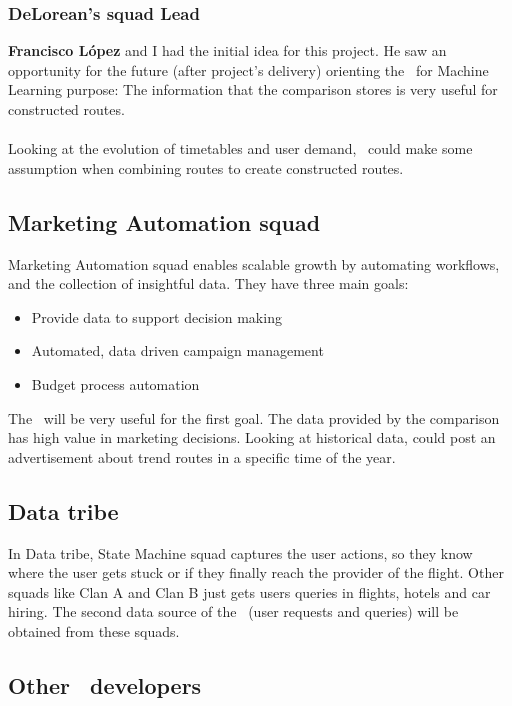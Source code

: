 \subsubsection*{DeLorean's squad Lead}

\textbf{Francisco López} and I had the initial idea for this project. He saw an opportunity for the future (after project's delivery) orienting the \thesis\ for Machine Learning purpose: The information that the comparison stores is very useful for constructed routes.
\\\\
Looking at the evolution of timetables and user demand, \squad\ could make some assumption when combining routes to create constructed routes.

\subsection{Marketing Automation squad} \label{mas}

Marketing Automation squad enables scalable growth by automating workflows, and the collection of insightful data. They have three main goals:

\begin{itemize}
  \item Provide data to support decision making
  \item Automated, data driven campaign management
  \item Budget process automation
\end{itemize}

The \thesis\ will be very useful for the first goal. The data provided by the comparison has high value in marketing decisions. Looking at historical data,  could post an advertisement about trend routes in a specific time of the year.

\subsection{Data tribe}

In Data tribe, State Machine squad captures the user actions, so they know where the user gets stuck or if they finally reach the provider of the flight. Other squads like Clan A and Clan B just gets users queries in flights, hotels and car hiring. The second data source of the \thesis\ (user requests and queries) will be obtained from these squads.

\subsection{Other \company\ developers}

